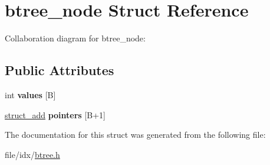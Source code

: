 \hypertarget{structbtree__node}{}\section{btree\+\_\+node Struct Reference}
\label{structbtree__node}


Collaboration diagram for btree\+\_\+node\+:
\subsection*{Public Attributes}
\begin{DoxyCompactItemize}
\item 
int {\bfseries values} \mbox{[}B\mbox{]}\hypertarget{structbtree__node_a61819a9f2241e41b96a2eceeccbc9d2e}{}\label{structbtree__node_a61819a9f2241e41b96a2eceeccbc9d2e}

\item 
\hyperlink{structstruct__add}{struct\+\_\+add} {\bfseries pointers} \mbox{[}B+1\mbox{]}\hypertarget{structbtree__node_ad339f2c6b4a564e947cf5cb0d5d44b51}{}\label{structbtree__node_ad339f2c6b4a564e947cf5cb0d5d44b51}

\end{DoxyCompactItemize}


The documentation for this struct was generated from the following file\+:\begin{DoxyCompactItemize}
\item 
file/idx/\hyperlink{btree_8h}{btree.\+h}\end{DoxyCompactItemize}
